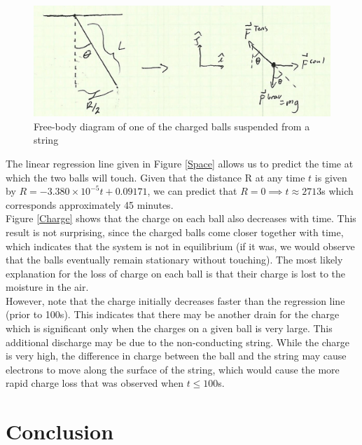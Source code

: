 \documentclass[oneside,12pt]{amsart}
\begin{document}
	\begin{figure}[h]
	\includegraphics[width=\linewidth,scale=0.01]{scan.png}
	\caption{Free-body diagram of one of the charged balls suspended from a string}
	\label{scn}
\end{figure}


\indent The linear regression line given in Figure \ref{Space} allows us to predict the time at which the two balls will touch. Given that the distance R at any time $t$ is given by $R = -3.380\times10^{-5}t + 0.09171$, we can predict that $R=0 \implies t \approx 2713$s which corresponds approximately 45 minutes.\\

\indent Figure \ref{Charge} shows that the charge on each ball also decreases with time. This result is not surprising, since the charged balls come closer together with time, which indicates that the system is not in equilibrium (if it was, we would observe that the balls eventually remain stationary without touching). The most likely explanation for the loss of charge on each ball is that their charge is lost to the moisture in the air.\\

\indent However, note that the charge initially decreases faster than the regression line (prior to 100s). This indicates that there may be another drain for the charge which is significant only when the charges on a given ball is very large. This additional discharge may be due to the non-conducting string. While the charge is very high, the difference in charge between the ball and the string may cause electrons to move along the surface of the string, which would cause the more rapid charge loss that was observed when $t\le 100$s. 

\section{Conclusion}
\end{document}
